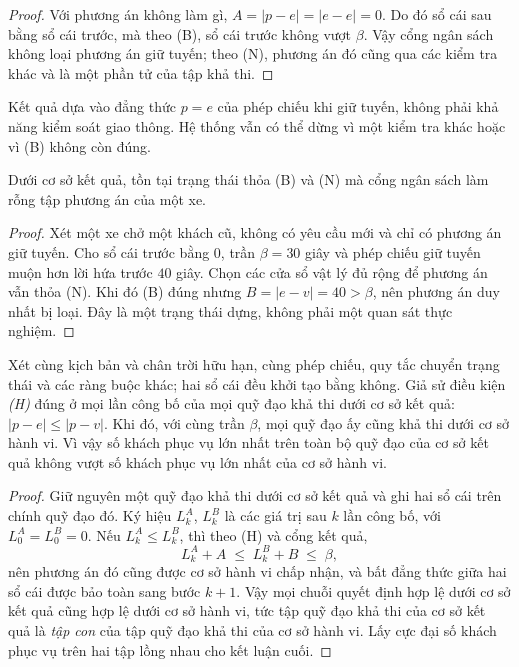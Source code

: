 \begin{proof}
Với phương án không làm gì, $A = |p - e| = |e - e| = 0$. Do đó sổ cái sau bằng sổ cái trước,
mà theo (B), sổ cái trước không vượt $\beta$. Vậy cổng ngân sách không loại phương án giữ
tuyến; theo (N), phương án đó cũng qua các kiểm tra khác và là một phần tử của tập khả thi.
\end{proof}

Kết quả dựa vào đẳng thức $p=e$ của phép chiếu khi giữ tuyến, không phải khả năng kiểm soát
giao thông. Hệ thống vẫn có thể dừng vì một kiểm tra khác hoặc vì (B) không còn đúng.

\begin{dinhly}

Dưới cơ sở kết quả, tồn tại trạng thái thỏa (B) và (N) mà cổng ngân sách làm rỗng tập
phương án của một xe.
\end{dinhly}

\begin{proof}
Xét một xe chở một khách cũ, không có yêu cầu mới và chỉ có phương án giữ tuyến. Cho sổ cái
trước bằng $0$, trần $\beta=30$ giây và phép chiếu giữ tuyến muộn hơn lời hứa trước $40$ giây.
Chọn các cửa sổ vật lý đủ rộng để phương án vẫn thỏa (N). Khi đó (B) đúng nhưng
$B=|e-v|=40>\beta$, nên phương án duy nhất bị loại. Đây là một trạng thái dựng, không phải
một quan sát thực nghiệm.
\end{proof}

\begin{dinhly}
\label{dl:tapcon}
Xét cùng kịch bản và chân trời hữu hạn, cùng phép chiếu, quy tắc chuyển trạng thái và các
ràng buộc khác; hai sổ cái đều khởi tạo bằng không. Giả sử điều kiện \emph{(H)} đúng ở mọi
lần công bố của mọi quỹ đạo khả thi dưới cơ sở kết quả:
$|p-e|\le|p-v|$. Khi đó, với cùng trần $\beta$, mọi quỹ đạo ấy cũng khả thi dưới cơ sở
hành vi. Vì vậy số khách phục vụ lớn nhất trên toàn bộ quỹ đạo của cơ sở kết quả không
vượt số khách phục vụ lớn nhất của cơ sở hành vi.
\end{dinhly}

\begin{proof}
Giữ nguyên một quỹ đạo khả thi dưới cơ sở kết quả và ghi hai sổ cái trên chính quỹ đạo đó.
Ký hiệu $L^{A}_k$, $L^{B}_k$ là các giá trị sau $k$ lần công bố, với
$L^{A}_0=L^{B}_0=0$. Nếu $L^{A}_k\le L^{B}_k$, thì theo (H) và cổng kết quả,
$$L^{A}_k + A \;\le\; L^{B}_k + B \;\le\; \beta,$$
nên phương án đó cũng được cơ sở hành vi chấp nhận, và bất đẳng thức giữa hai sổ cái được bảo
toàn sang bước $k+1$. Vậy mọi chuỗi quyết định hợp lệ dưới cơ sở kết quả cũng hợp lệ dưới cơ sở
hành vi, tức tập quỹ đạo khả thi của cơ sở kết quả là \emph{tập con} của tập quỹ đạo khả thi của
cơ sở hành vi. Lấy cực đại số khách phục vụ trên hai tập lồng nhau cho kết luận cuối.
\end{proof}

